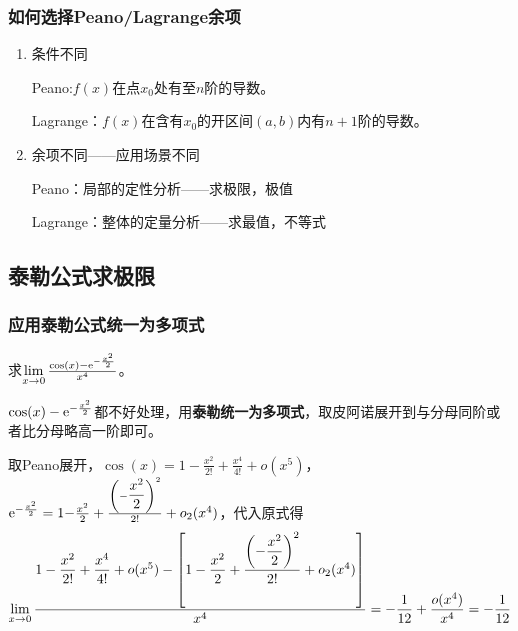 \subsubsection{如何选择Peano/Lagrange余项}
\begin{enumerate}
	\item 条件不同
	
	Peano:$f(x)$在点$x_0$处有至$n$阶的导数。
	
	Lagrange：$f(x)$在含有$x_0$的开区间$(a,b)$内有$n+1$阶的导数。
	
	\item 余项不同——应用场景不同
	
	Peano：局部的定性分析——求极限，极值
	
	Lagrange：整体的定量分析——求最值，不等式
\end{enumerate}

\subsection{泰勒公式求极限}
\subsubsection{应用泰勒公式统一为多项式}

\begin{problem}
	求$\lim\limits_{x\rightarrow 0}\frac{\cos(x)-{\rm e}^{-\frac{x^2}{2}}}{x^4}$。
	\begin{solution}
		$\cos(x)-{\rm e}^{-\frac{x^2}{2}}$都不好处理，用\textbf{泰勒统一为多项式}，取皮阿诺展开到与分母同阶或者比分母略高一阶即可。
		
		取Peano展开，$\cos(x)=1-\frac{x^2}{2!}+\frac{x^4}{4!}+o(x^5)$，${\rm e}^{-\frac{x^2}{2}}=1{-\frac{x^2}{2}}+\frac{\qty({-\dfrac{x^2}{2}})^2}{2!}+o_2(x^4)$，代入原式得
		\begin{equation*}
			\lim\limits_{x\rightarrow 0}\frac{1-\dfrac{x^2}{2!}+\dfrac{x^4}{4!}+o(x^5)-\qty[1-\dfrac{x^2}{2}+\dfrac{\qty(-\dfrac{x^2}{2})^2}{2!}+o_2(x^4)]}{x^4}=-\frac{1}{12}+\frac{o(x^4)}{x^4}=-\frac{1}{12}
		\end{equation*}
	\end{solution}
\end{problem}

